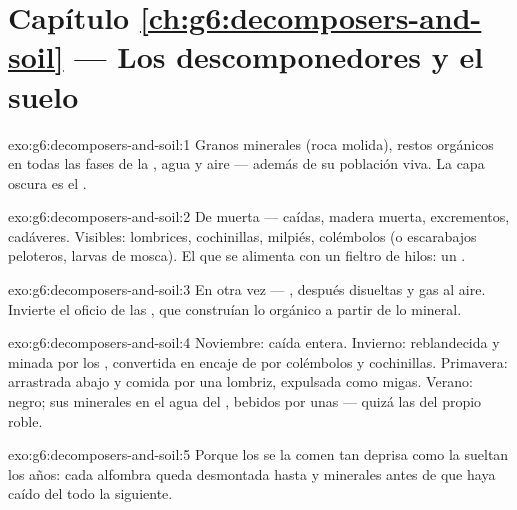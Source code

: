 \section*{Capítulo \ref{ch:g6:decomposers-and-soil} --- Los descomponedores y el suelo}

\begin{solution}{exo:g6:decomposers-and-soil:1}
Granos minerales (roca molida), restos orgánicos en todas las fases de
la , agua y aire --- además de su población viva. La capa
oscura es el .
\end{solution}

\begin{solution}{exo:g6:decomposers-and-soil:2}
De  muerta ---  caídas, madera muerta,
excrementos, cadáveres. Visibles: lombrices, cochinillas, milpiés,
colémbolos (o escarabajos peloteros, larvas de mosca). El que se
alimenta con un fieltro de hilos: un .
\end{solution}

\begin{solution}{exo:g6:decomposers-and-soil:3}
En  otra vez --- , después 
disueltas y gas al aire. Invierte el oficio de las , que
construían lo orgánico a partir de lo mineral.
\end{solution}

\begin{solution}{exo:g6:decomposers-and-soil:4}
Noviembre: caída entera. Invierno: reblandecida y minada por los
, convertida en encaje de  por colémbolos y cochinillas.
Primavera: arrastrada abajo y comida por una lombriz, expulsada como
migas. Verano:  negro; sus minerales en el agua del , bebidos
por unas  --- quizá las del propio roble.
\end{solution}

\begin{solution}{exo:g6:decomposers-and-soil:5}
Porque los  se la comen tan deprisa como la sueltan los
años: cada alfombra queda desmontada hasta  y minerales antes de
que haya caído del todo la siguiente.
\end{solution}

